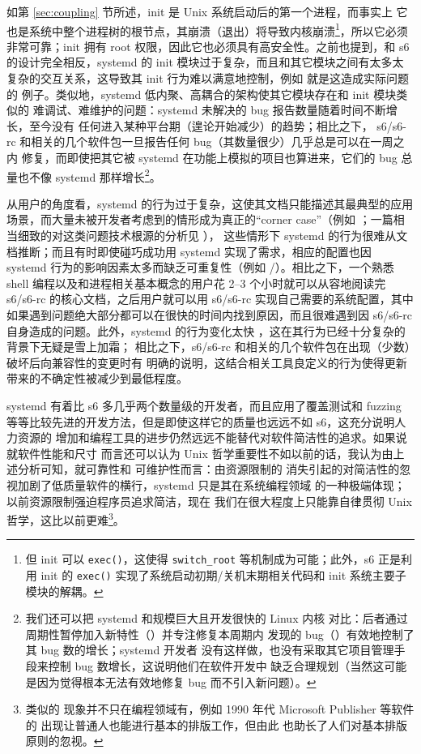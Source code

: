如第 \ref{sec:coupling} 节所述，init 是 Unix 系统启动后的第一个进程，而事实上
它也是系统中整个进程树的根节点，其崩溃（退出）将导致内核崩溃\footnote{但 init
可以 \texttt{exec()}，这使得 \texttt{switch\_root} 等机制成为可能；此外，s6
正是利用 init 的 \texttt{exec()} 实现了系统启动初期/关机末期相关代码和 init
系统主要子模块的解耦。}，所以它必须非常可靠；init 拥有 root
权限，因此它也必须具有高安全性。之前也提到，和 s6 的设计完全相反，systemd 的
init 模块过于复杂，而且和其它模块之间有太多太复杂的交互关系，这导致其 init
行为难以满意地控制，例如 \parencite{ayer2016, edge2017} 就是这造成实际问题的
例子。类似地，systemd 低内聚、高耦合的架构使其它模块存在和 init 模块类似的
难调试、难维护的问题：systemd 未解决的 bug 报告数量随着时间不断增长，至今没有
任何进入某种平台期（遑论开始减少）的趋势；相比之下，%
s6/s6-rc 和相关的几个软件包一旦报告任何 bug（其数量很少）几乎总是可以在一周之内
修复，而即使把其它被 systemd 在功能上模拟的项目也算进来，它们的 bug 总量也不像
systemd 那样增长\footnote{我们还可以把 systemd 和规模巨大且开发很快的 Linux 内核
对比：后者通过周期性暂停加入新特性（）并专注修复本周期内
发现的 bug（）有效地控制了其 bug 数的增长；systemd 开发者
没有这样做，也没有采取其它项目管理手段来控制 bug 数增长，这说明他们在软件开发中
缺乏合理规划（当然这可能是因为觉得根本无法有效地修复 bug 而不引入新问题）。}。

从用户的角度看，systemd 的行为过于复杂，这使其文档只能描述其最典型的应用
场景，而大量未被开发者考虑到的情形成为真正的“corner case”（例如 \parencite%
{dbiii2016}；一篇相当细致的对这类问题技术根源的分析见 \parencite{vr2015}），
这些情形下 systemd 的行为很难从文档推断；而且有时即使碰巧成功用 systemd
实现了需求，相应的配置也因 systemd 行为的影响因素太多而缺乏可重复性（例如
\parencite{fitzcarraldo2018}/\parencite{zlogic2019}）。相比之下，一个熟悉
shell 编程以及和进程相关基本概念的用户花 2--3 个小时就可以从容地阅读完
s6/s6-rc 的核心文档，之后用户就可以用 s6/s6-rc 实现自己需要的系统配置，其中
如果遇到问题绝大部分都可以在很快的时间内找到原因，而且很难遇到因 s6/s6-rc
自身造成的问题。此外，systemd 的行为变化太快%
，这在其行为已经十分复杂的背景下无疑是雪上加霜；
相比之下，s6/s6-rc 和相关的几个软件包在出现（少数）破坏后向兼容性的变更时有
明确的说明，这结合相关工具良定义的行为使得更新带来的不确定性被减少到最低程度。

systemd 有着比 s6 多几乎两个数量级的开发者，而且应用了覆盖测试和 fuzzing
等等比较先进的开发方法，但是即使这样它的质量也远远不如 s6，这充分说明人力资源的
增加和编程工具的进步仍然远远不能替代对软件简洁性的追求。如果说就软件性能和尺寸
而言还可以认为 Unix 哲学重要性不如以前的话，我认为由上述分析可知，就可靠性和
可维护性而言：由资源限制的
消失引起的对简洁性的忽视加剧了低质量软件的横行，systemd 只是其在系统编程领域
的一种极端体现；以前资源限制强迫程序员追求简洁，现在
我们在很大程度上只能靠自律贯彻 Unix 哲学，这比以前更难\footnote{类似的
现象并不只在编程领域有，例如 1990 年代 Microsoft Publisher 等软件的
出现让普通人也能进行基本的排版工作，但由此
也助长了人们对基本排版原则的忽视。}。

